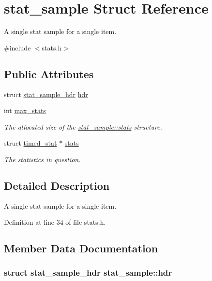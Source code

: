 \hypertarget{structstat__sample}{\section{stat\-\_\-sample Struct Reference}
\label{structstat__sample}
}


A single stat sample for a single item.  




{\ttfamily \#include $<$stats.\-h$>$}

\subsection*{Public Attributes}
\begin{DoxyCompactItemize}
\item 
struct \hyperlink{structstat__sample__hdr}{stat\-\_\-sample\-\_\-hdr} \hyperlink{structstat__sample_acaef0f7b806544e00dfe8095bbf98842}{hdr}
\item 
int \hyperlink{structstat__sample_a9915339fedc4af2eee8ded2869cdb351}{max\-\_\-stats}
\begin{DoxyCompactList}\small\item\em The allocated size of the \hyperlink{structstat__sample_aa1e64901d0a1f17a163714488baa99fb}{stat\-\_\-sample\-::stats} structure. \end{DoxyCompactList}\item 
struct \hyperlink{structtimed__stat}{timed\-\_\-stat} $\ast$ \hyperlink{structstat__sample_aa1e64901d0a1f17a163714488baa99fb}{stats}
\begin{DoxyCompactList}\small\item\em The statistics in question. \end{DoxyCompactList}\end{DoxyCompactItemize}


\subsection{Detailed Description}
A single stat sample for a single item. 

Definition at line 34 of file stats.\-h.



\subsection{Member Data Documentation}
\hypertarget{structstat__sample_acaef0f7b806544e00dfe8095bbf98842}{
\subsubsection[{hdr}]{\setlength{\rightskip}{0pt plus 5cm}struct {\bf stat\-\_\-sample\-\_\-hdr} stat\-\_\-sample\-::hdr}}\label{structstat__sample_acaef0f7b806544e00dfe8095bbf98842}



